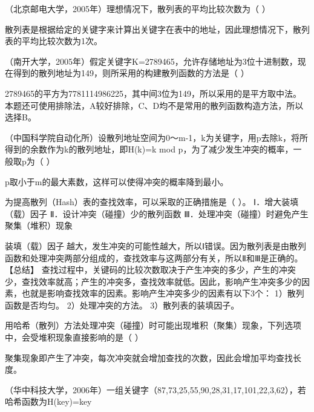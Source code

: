 \question （北京邮电大学，2005年）理想情况下，散列表的平均比较次数为（ ）
\par{}
\begin{solution}散列表是根据给定的关键字来计算出关键字在表中的地址，因此理想情况下，散列表的平均比较次数为1次。
\end{solution}
\question （南开大学，2005年）假定关键字K=2789465，允许存储地址为3位十进制数，现在得到的散列地址为149，则所采用的构建散列函数的方法是（
）
\par{}
\begin{solution}2789465的平方为7781114986225，其中间3位为149，所以采用的是平方取中法。
本题还可使用排除法，A较好排除，C、D均不是常用的散列函数构造方法，所以选择B。
\end{solution}
\question （中国科学院自动化所）设散列地址空间为0～m-1，k为关键字，用p去除k，将所得到的余数作为k的散列地址，即H(k)=k
mod p，为了减少发生冲突的概率，一般取p为（ ）
\par{}
\begin{solution}p取小于m的最大素数，这样可以使得冲突的概率降到最小。
\end{solution}
\question 为提高散列（Hash）表的查找效率，可以采取的正确措施是（ ）。
Ⅰ．增大装填（载）因子 Ⅱ．设计冲突（碰撞）少的散列函数
Ⅲ．处理冲突（碰撞）时避免产生聚集（堆积）现象
\par{}
\begin{solution}装填（载）因子越大，发生冲突的可能性越大，所以Ⅰ错误。因为散列表是由散列函数和处理冲突两部分组成的，查找效率与这两部分有关，所以Ⅱ和Ⅲ是正确的。
【总结】
查找过程中，关键码的比较次数取决于产生冲突的多少，产生的冲突少，查找效率就高；产生的冲突多，查找效率就低。因此，影响产生冲突多少的因素，也就是影响查找效率的因素。影响产生冲突多少的因素有以下3个：
1）散列函数是否均匀。 2）处理冲突的方法。 3）散列表的装填因子。
\end{solution}
\question 用哈希（散列）方法处理冲突（碰撞）时可能出现堆积（聚集）现象，下列选项中，会受堆积现象直接影响的是（
）
\par{}
\begin{solution}聚集现象即产生了冲突，每次冲突就会增加查找的次数，因此会增加平均查找长度。
\end{solution}
\question （华中科技大学，2006年）一组关键字（87,73,25,55,90,28,31,17,101,22,3,62），若哈希函数为H(key)=key
